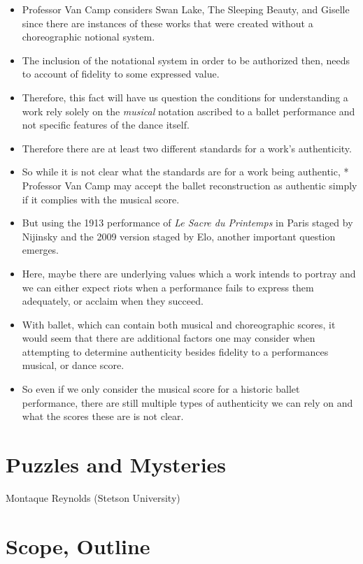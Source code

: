 \documentclass[
  letterpaper,
  DIV=11,
  numbers=noendperiod]{scrreprt}
\begin{document}
\begin{tcolorbox}[enhanced jigsaw, arc=.35mm, breakable, rightrule=.15mm, colback=white, colframe=quarto-callout-important-color-frame, bottomrule=.15mm, leftrule=.75mm, opacityback=0, toprule=.15mm, left=2mm]
\begin{tcolorbox}[enhanced jigsaw, arc=.35mm, breakable, rightrule=.15mm, colback=white, colframe=quarto-callout-tip-color-frame, bottomrule=.15mm, leftrule=.75mm, opacityback=0, toprule=.15mm, left=2mm]
\begin{itemize}
\item
  Professor Van Camp considers Swan Lake, The Sleeping Beauty, and
  Giselle since there are instances of these works that were created
  without a choreographic notional system.
\item
  The inclusion of the notational system in order to be authorized then,
  needs to account of fidelity to some expressed value.
\item
  Therefore, this fact will have us question the conditions for
  understanding a work rely solely on the \emph{musical} notation
  ascribed to a ballet performance and not specific features of the
  dance itself.
\item
  Therefore there are at least two different standards for a work's
  authenticity.
\item
  So while it is not clear what the standards are for a work being
  authentic, * Professor Van Camp may accept the ballet reconstruction
  as authentic simply if it complies with the musical score.
\item
  But using the 1913 performance of \emph{Le Sacre du Printemps} in
  Paris staged by Nijinsky and the 2009 version staged by Elo, another
  important question emerges.
\item
  Here, maybe there are underlying values which a work intends to
  portray and we can either expect riots when a performance fails to
  express them adequately, or acclaim when they succeed.
\item
  With ballet, which can contain both musical and choreographic scores,
  it would seem that there are additional factors one may consider when
  attempting to determine authenticity besides fidelity to a
  performances musical, or dance score.
\item
  So even if we only consider the musical score for a historic ballet
  performance, there are still multiple types of authenticity we can
  rely on and what the scores these are is not clear.
\end{itemize}

\chapter{Puzzles and Mysteries}\label{puzzles-and-mysteries}

Montaque Reynolds (Stetson University)

\hfill\break

\chapter{Scope, Outline}\label{scope-outline}


\end{tcolorbox}
\end{tcolorbox}
\end{document}
